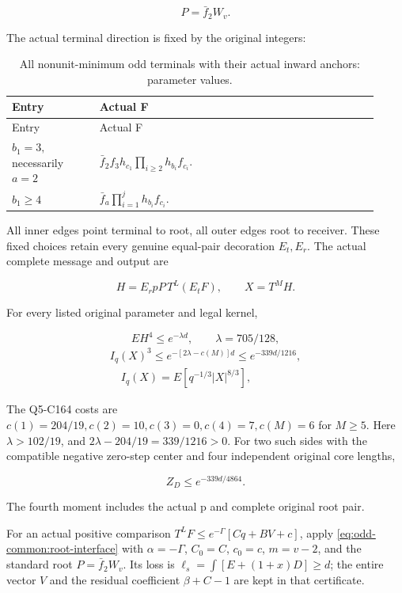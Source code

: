 \[
P=\bar f_2W_v.
\]

The actual terminal direction is fixed by the original integers:


\begingroup\small
\setlength{\tabcolsep}{3pt}
\setlength{\LTleft}{0pt}\setlength{\LTright}{\fill}
\begin{longtable}{@{}p{0.2200\linewidth}p{0.7000\linewidth}@{}}
\caption{All nonunit-minimum odd terminals with their actual inward anchors: parameter values.}\label{tab:parameters:q5-c181:1}\\
\toprule
Entry & Actual F \\
\midrule\endfirsthead
\toprule
Entry & Actual F \\
\midrule\endhead
\bottomrule\endfoot
\(b_1=3,\allowbreak \) necessarily \(a=2\) & \(\bar f_2 f_3 h_{c_1} \prod_{i\ge 2}h_{b_i}f_{c_i}\). \\
\addlinespace[2pt]
\(b_1\ge 4\) & \(\bar f_a \prod_{i=1}^{j}h_{b_i}f_{c_i}\). \\
\end{longtable}
\endgroup


All inner edges point terminal to root, all outer edges root to receiver. These fixed choices retain every genuine equal-pair decoration \(E_t,\allowbreak \allowbreak  E_r\). The actual complete message and output are

\[
H=E_rpP\,T^L(E_tF),\qquad X=T^MH.
\tag{C181.T190.2}
\]

For every listed original parameter and legal kernel,

\[
\boxed{EH^4\le e^{-\lambda d},\qquad \lambda=705/128,}
\tag{C181.T190.A}
\]
\[
\boxed{\begin{gathered}
I_q(X)^3\le e^{-[2\lambda-c(M)]d}\le e^{-339d/1216},\\
\quad I_q(X)=E[q^{-1/3}|X|^{8/3}],
\end{gathered}}\tag{C181.T190.B}
\]

The Q5-C164 costs are \(c(1)=204/19,\allowbreak \allowbreak  c(2)=10,\allowbreak \allowbreak  c(3)=0,\allowbreak \allowbreak  c(4)=7,\allowbreak \allowbreak  c(M)=6\) for \(M\ge5\). Here \(\lambda>102/19\), and \(2\lambda-204/19=339/1216>0\). For two such sides with the compatible negative zero-step center and four independent original core lengths,

\[
Z_D\le e^{-339d/4864}.
\tag{C181.T190.C}
\]

The fourth moment includes the actual p and complete original root pair.


For an actual positive comparison
\(T^LF\le e^{-\Gamma}[Cq+BV+c]\), apply
\eqref{eq:odd-common:root-interface} with
\(\alpha=-\Gamma\), \(C_0=C\), \(c_0=c\),
\(m=v-2\), and the standard root \(P=\bar f_2W_v\).
Its loss is \(\ell_s=\int[E+(1+x)D]\ge d\);
the entire vector \(V\) and the residual coefficient \(\beta+C-1\)
are kept in that certificate.


